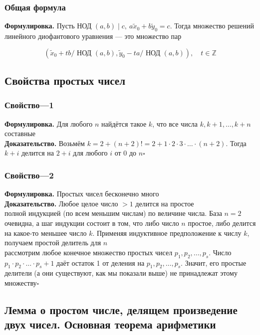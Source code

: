 \documentclass[a4paper]{article}
\newcommand{\qed}{\hfill$\square$}
\begin{document}
\subsubsection*{Общая формула}
\textbf{Формулировка.} Пусть НОД $(a, b) \mid c,\ a \tilde{x}_{0}+b \tilde{y}_{0}=c$. Тогда множество решений линейного диофантового уравнения — это множество пар

$$
\left(\tilde{x}_{0}+t b / \text { НОД }(a, b), \tilde{y}_{0}-t a / \text { НОД }(a, b)\right), \quad t \in \mathbb{Z}
$$

\subsection{Свойства простых чисел}
\subsubsection*{Свойство—1}
\textbf{Формулировка.} Для любого $n$ найдётся такое $k$, что все числа $k, k + 1,\ldots, k + n$ составные\\[2mm]
\indent\textbf{Доказательство.} Возьмём $k = 2+(n+2)! = 2+1\cdot2\cdot3\cdot\ldots\cdot(n+2).$ Тогда $k+i$ делится на $2+i$ для любого $i$ от 0 до $n$\qed

\subsubsection*{Свойство—2}
\textbf{Формулировка.} Простых чисел бесконечно много\\[2mm]
\indent\textbf{Доказательство.} Любое целое число $>1$ делится на простое\\
 полной индукцией (по всем меньшим числам) по величине числа. База $n=2$ очевидна, а шаг индукции состоит в том, что либо число $n$ простое, либо делится на какое-то меньшее число $k$. Применяя индуктивное предположение к числу $k$, получаем простой делитель для $n$\\[2mm]
 рассмотрим любое конечное множество простых чисел $p_{1}, p_{2}, \ldots, p_{s}$. Число $p_{1} \cdot p_{2} \cdot \ldots \cdot p_{s}+1$ даёт остаток 1 от деления на $p_{1}, p_{2}, \ldots, p_{s}$. Значит, его простые делители (а они существуют, как мы показали выше) не принадлежат этому множеству\qed


\subsection{Лемма о простом числе, делящем произведение двух чисел. Основная теорема арифметики}
\end{document}
